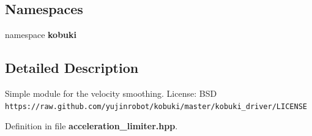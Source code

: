 \subsection*{\-Namespaces}
\begin{DoxyCompactItemize}
\item 
namespace {\bf kobuki}
\end{DoxyCompactItemize}


\subsection{\-Detailed \-Description}
\-Simple module for the velocity smoothing. \-License\-: \-B\-S\-D {\tt https\-://raw.\-github.\-com/yujinrobot/kobuki/master/kobuki\-\_\-driver/\-L\-I\-C\-E\-N\-S\-E} 

\-Definition in file {\bf acceleration\-\_\-limiter.\-hpp}.

